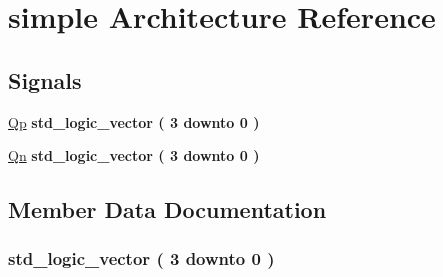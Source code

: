 \hypertarget{class_fsm_read_1_1simple}{}\section{simple Architecture Reference}
\label{class_fsm_read_1_1simple}
\subsection*{Signals}
 \begin{DoxyCompactItemize}
\item 
\hyperlink{class_fsm_read_1_1simple_a1374ca621da8c3ce3b11dc3a52dec0cf}{Qp} {\bfseries \textcolor{comment}{std\+\_\+logic\+\_\+vector}\textcolor{vhdlchar}{ }\textcolor{vhdlchar}{(}\textcolor{vhdlchar}{ }\textcolor{vhdlchar}{ } \textcolor{vhdldigit}{3} \textcolor{vhdlchar}{ }\textcolor{keywordflow}{downto}\textcolor{vhdlchar}{ }\textcolor{vhdlchar}{ } \textcolor{vhdldigit}{0} \textcolor{vhdlchar}{ }\textcolor{vhdlchar}{)}\textcolor{vhdlchar}{ }} 
\item 
\hyperlink{class_fsm_read_1_1simple_a70a8d40eb6414ccea4a1bbd562251964}{Qn} {\bfseries \textcolor{comment}{std\+\_\+logic\+\_\+vector}\textcolor{vhdlchar}{ }\textcolor{vhdlchar}{(}\textcolor{vhdlchar}{ }\textcolor{vhdlchar}{ } \textcolor{vhdldigit}{3} \textcolor{vhdlchar}{ }\textcolor{keywordflow}{downto}\textcolor{vhdlchar}{ }\textcolor{vhdlchar}{ } \textcolor{vhdldigit}{0} \textcolor{vhdlchar}{ }\textcolor{vhdlchar}{)}\textcolor{vhdlchar}{ }} 
\end{DoxyCompactItemize}


\subsection{Member Data Documentation}
\hypertarget{class_fsm_read_1_1simple_a70a8d40eb6414ccea4a1bbd562251964}{}
\subsubsection[{Qn}]{ {\bfseries \textcolor{comment}{std\+\_\+logic\+\_\+vector}\textcolor{vhdlchar}{ }\textcolor{vhdlchar}{(}\textcolor{vhdlchar}{ }\textcolor{vhdlchar}{ } \textcolor{vhdldigit}{3} \textcolor{vhdlchar}{ }\textcolor{keywordflow}{downto}\textcolor{vhdlchar}{ }\textcolor{vhdlchar}{ } \textcolor{vhdldigit}{0} \textcolor{vhdlchar}{ }\textcolor{vhdlchar}{)}\textcolor{vhdlchar}{ }} \hspace{0.3cm}{\ttfamily [Signal]}}\label{class_fsm_read_1_1simple_a70a8d40eb6414ccea4a1bbd562251964}
\hypertarget{class_fsm_read_1_1simple_a1374ca621da8c3ce3b11dc3a52dec0cf}{}
